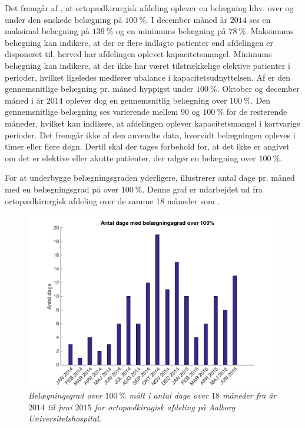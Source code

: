 \noindent
Det fremgår af , at ortopædkirurgisk afdeling oplever en belægning hhv. over og under den ønskede belægning på $100~\%$. I december måned år $2014$ ses en maksimal belægning på $139~\%$ og en minimums belægning på $78~\%$. Maksimums belægning kan indikere, at der er flere indlagte patienter end afdelingen er disponeret til, herved har afdelingen oplevet kapacitetsmangel. Minimums belægning kan indikere, at der ikke har været tilstrækkelige elektive patienter i perioder, hvilket ligeledes medfører ubalance i kapacitetsudnyttelsen. Af  er den gennemsnitlige belægning pr. måned hyppigst under $100~\%$. Oktober og december måned i år $2014$ oplever dog en gennemsnitlig belægning over $100~\%$. Den gennemsnitlige belægning ses varierende mellem $90$ og $100~\%$ for de resterende måneder, hvilket kan indikere, at afdelingen oplever kapacitetsmangel i kortvarige perioder.\cite{SDS2015} 
Det fremgår ikke af den anvendte data, hvorvidt belægningen opleves i timer eller flere døgn. Dertil skal der tages forbehold for, at det ikke er angivet om det er elektive eller akutte patienter, der udgør en belægning over $100~\%$.\cite{SDS2015} 

 
For at underbygge belægningsgraden yderligere, illustrerer  antal dage pr. måned med en belægningsgrad på over $100~\%$. Denne graf er udarbejdet ud fra ortopædkirurgisk afdeling over de samme 18 måneder som . \cite{SDS2015} 

\begin{figure}[H]
	\flushleft 
	\centering
	\includegraphics[scale=.4]{figures/antaldage.png}
	\flushleft
	\caption{\textit{Belægningsgrad over $100~\%$ målt i antal dage over $18$ måneder fra år $2014$ til juni $2015$ for ortopædkirugisk afdeling på Aalborg Universitetshospital.}\cite{SDS2015}}
	\label{antaldage}
\end{figure}

